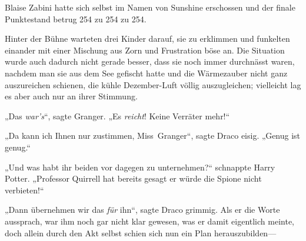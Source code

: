 Blaise Zabini hatte sich selbst im Namen von Sunshine erschossen und der finale Punktestand betrug 254 zu 254 zu 254.

\later

Hinter der Bühne warteten drei Kinder darauf, sie zu erklimmen und funkelten einander mit einer Mischung aus Zorn und Frustration böse an. Die Situation wurde auch dadurch nicht gerade besser, dass sie noch immer durchnässt waren, nachdem man sie aus dem See gefischt hatte und die Wärmezauber nicht ganz auszureichen schienen, die kühle Dezember-Luft völlig auszugleichen; vielleicht lag es aber auch nur an ihrer Stimmung.

„Das \emph{war’s}“, sagte Granger. „Es \emph{reicht}! Keine Verräter mehr!“

„Da kann ich Ihnen nur zustimmen, Miss~Granger“, sagte Draco eisig. „Genug ist genug.“

„Und was habt ihr beiden vor dagegen zu unternehmen?“ schnappte Harry Potter. „Professor Quirrell hat bereits gesagt er würde die Spione nicht verbieten!“

„Dann übernehmen wir das \emph{für} ihn“, sagte Draco grimmig. Als er die Worte aussprach, war ihm noch gar nicht klar gewesen, was er damit eigentlich meinte, doch allein durch den Akt selbst schien sich nun ein Plan herauszubilden—

\later

